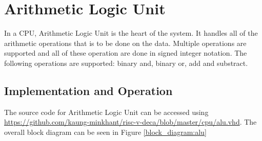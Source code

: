 \section{Arithmetic Logic Unit}
In a CPU, Arithmetic Logic Unit is the heart of the system.
It handles all of the arithmetic operations that is to be done on the data.
Multiple operations are supported and all of these operation are done in signed integer notation.
The following operations are supported: binary and, binary or, add and substract.

\subsection{Implementation and Operation}
The source code for Arithmetic Logic Unit
can be accessed using \url{https://github.com/kaung-minkhant/risc-v-deca/blob/master/cpu/alu.vhd}.
The overall block diagram can be seen in Figure \ref{block_diagram:alu}

\begin{table}[!h]
    \centering
    \caption{Input/Output of Arithmetic Logic Unit}
    \label{table:io_alu}
\end{table}

